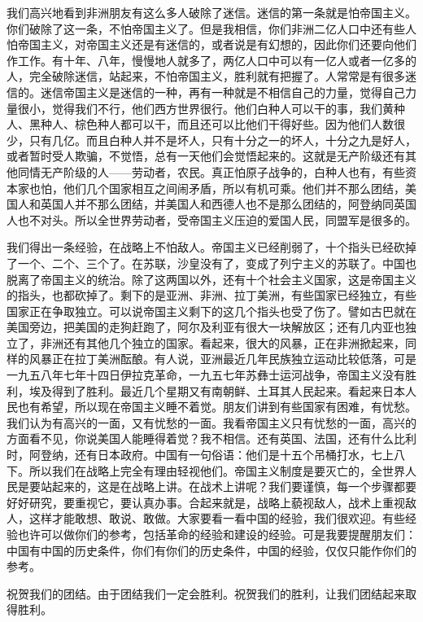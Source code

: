我们高兴地看到非洲朋友有这么多人破除了迷信。迷信的第一条就是怕帝国主义。你们破除了这一条，不怕帝国主义了。但是我相信，你们非洲二亿人口中还有些人怕帝国主义，对帝国主义还是有迷信的，或者说是有幻想的，因此你们还要向他们作工作。有十年、八年，慢慢地人就多了，两亿人口中可以有一亿人或者一亿多的人，完全破除迷信，站起来，不怕帝国主义，胜利就有把握了。人常常是有很多迷信的。迷信帝国主义是迷信的一种，再有一种就是不相信自己的力量，觉得自己力量很小，觉得我们不行，他们西方世界很行。他们白种人可以干的事，我们黄种人、黑种人、棕色种人都可以干，而且还可以比他们干得好些。因为他们人数很少，只有几亿。而且白种人并不是坏人，只有十分之一的坏人，十分之九是好人，或者暂时受人欺骗，不觉悟，总有一天他们会觉悟起来的。这就是无产阶级还有其他同情无产阶级的人——劳动者，农民。真正怕原子战争的，白种人也有，有些资本家也怕，他们几个国家相互之间闹矛盾，所以有机可乘。他们并不那么团结，美国人和英国人并不那么团结，并美国人和西德人也不是那么团结的，阿登纳同英国人也不对头。所以全世界劳动者，受帝国主义压迫的爱国人民，同盟军是很多的。

我们得出一条经验，在战略上不怕敌人。帝国主义已经削弱了，十个指头已经砍掉了一个、二个、三个了。在苏联，沙皇没有了，变成了列宁主义的苏联了。中国也脱离了帝国主义的统治。除了这两国以外，还有十个社会主义国家，这是帝国主义的指头，也都砍掉了。剩下的是亚洲、非洲、拉丁美洲，有些国家已经独立，有些国家正在争取独立。可以说帝国主义剩下的这几个指头也受了伤了。譬如古巴就在美国旁边，把美国的走狗赶跑了，阿尔及利亚有很大一块解放区；还有几内亚也独立了，非洲还有其他几个独立的国家。看起来，很大的风暴，正在非洲掀起来，同样的风暴正在拉丁美洲酝酿。有人说，亚洲最近几年民族独立运动比较低落，可是一九五八年七年十四日伊拉克革命，一九五七年苏彝士运河战争，帝国主义没有胜利，埃及得到了胜利。最近几个星期又有南朝鲜、土耳其人民起来。看起来日本人民也有希望，所以现在帝国主义睡不着觉。朋友们讲到有些国家有困难，有忧愁。我们认为有高兴的一面，又有忧愁的一面。我看帝国主义只有忧愁的一面，高兴的方面看不见，你说美国人能睡得着觉？我不相信。还有英国、法国，还有什么比利时，阿登纳，还有日本政府。中国有一句俗语：他们是十五个吊桶打水，七上八下。所以我们在战略上完全有理由轻视他们。帝国主义制度是要灭亡的，全世界人民是要站起来的，这是在战略上讲。在战术上讲呢？我们要谨慎，每一个步骤都要好好研究，要重视它，要认真办事。合起来就是，战略上藐视敌人，战术上重视敌人，这样才能敢想、敢说、敢做。大家要看一看中国的经验，我们很欢迎。有些经验也许可以做你们的参考，包括革命的经验和建设的经验。可是我要提醒朋友们：中国有中国的历史条件，你们有你们的历史条件，中国的经验，仅仅只能作你们的参考。

祝贺我们的团结。由于团结我们一定会胜利。祝贺我们的胜利，让我们团结起来取得胜利。



